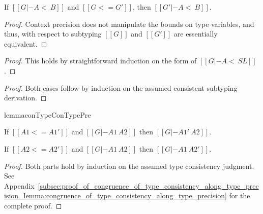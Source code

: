 \begin{lemma}
  \label{lemma:subtyping_context_precision}
  If $[[G |- A <~ B]]$ and $[[G <= G']]$, then $[[G' |- A <~ B]]$.
\end{lemma}
\begin{proof}
  Context precision does not manipulate the bounds on type variables, and thus,
  with respect to subtyping $[[G]]$ and $[[G']]$ are essentially equivalent.
\end{proof}

\begin{proof}
  This holds by straightforward induction on the form of $[[G |- A <~ SL]]$.
\end{proof}

\begin{proof}
  Both cases follow by induction on the assumed consistent subtyping
  derivation.
\end{proof}

\begin{restatable}{lemma}{conTypeConTypePre}
  \label{lemma:congruence_of_type_consistency_along_type_precision}
  \begin{enumR}
  \item If $[[A1 <= A1']]$ and $[[G |- A1 ~ A2]]$ then
    $[[G |- A1' ~ A2]]$.
    
  \item If $[[A2 <= A2']]$ and $[[G |- A1 ~ A2]]$ then
    $[[G |- A1 ~ A2']]$.  
  \end{enumR}  
\end{restatable}
\begin{proof}
  Both parts hold by induction on the assumed type consistency
  judgment.  See
  Appendix~\ref{subsec:proof_of_congruence_of_type_consistency_along_type_precision_lemma:congruence_of_type_consistency_along_type_precision}
  for the complete proof.
\end{proof}

